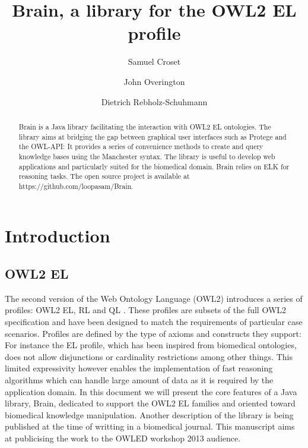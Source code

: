\documentclass{llncs}
\begin{document}
%
\frontmatter          %
%
\pagestyle{headings}  %

\mainmatter              %
%
\title{Brain, a library for the OWL2 EL profile}
%
\author{Samuel Croset \and John Overington \and Dietrich Rebholz-Schuhmann}

\maketitle              %

\begin{abstract}
Brain is a Java library facilitating the interaction with OWL2 EL ontologies. 
The library aims at bridging the gap between graphical user interfaces such as Protege and the OWL-API: It provides 
a series of convenience methods to create and query knowledge bases using the Manchester syntax. 
The library is useful to develop web applications and particularly suited for the biomedical domain. 
Brain relies on ELK for reasoning tasks. The open source project is available at https://github.com/loopasam/Brain.

\end{abstract}

\section{Introduction}
\subsection{OWL2 EL}
The second version of the Web Ontology Language (OWL2) introduces a series of profiles: OWL2 EL, RL and QL \cite{owlprofile}.
These profiles are subsets of the full OWL2 specification and have been designed to match the requirements of particular case scenarios.
Profiles are defined by the type of axioms and constructs they support: For instance the EL profile, which has been 
inspired from biomedical ontologies, does not allow 
disjunctions or cardinality restrictions among other things. 
This limited expressivity however enables the implementation of fast reasoning algorithms which can
handle large amount of data as it is required by the application domain. In this document we will present the core features of a 
Java library, Brain, dedicated to support the OWL2 EL families and oriented toward biomedical knowledge manipulation. Another description
of the library is being published at the time of writting in a biomedical journal. This manuscript aims at publicising the work to the
OWLED workshop 2013 audience.
\end{document}
